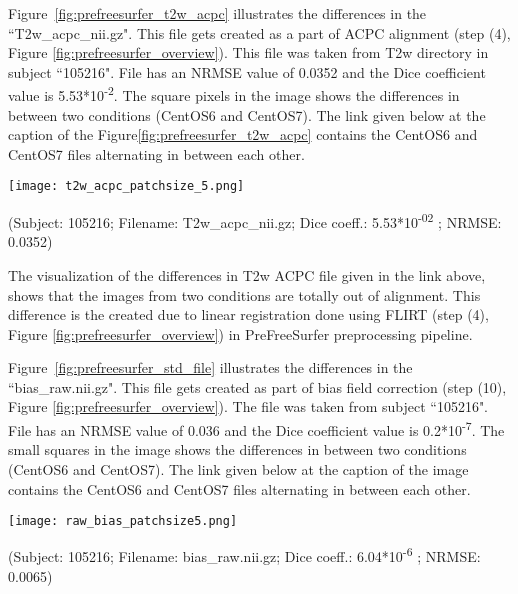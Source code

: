 Figure~\ref{fig:prefreesurfer_t2w_acpc} illustrates the differences in the ``T2w\_acpc\_nii.gz". This file gets created as a part of ACPC alignment (step (4), Figure \ref{fig:prefreesurfer_overview}). This file was taken from T2w directory in subject ``105216". File has an NRMSE value of 0.0352 and the Dice coefficient value is 5.53*10\textsuperscript{-2}. The square pixels in the image shows the differences in between two conditions (CentOS6 and CentOS7). The link given below at the caption of the Figure\ref{fig:prefreesurfer_t2w_acpc} contains the CentOS6 and CentOS7 files alternating in between each other.

\begin{center}
\texttt{[image: t2w\_acpc\_patchsize\_5.png]}
\caption*{(Subject: 105216; Filename: T2w\_acpc\_nii.gz; Dice coeff.: 5.53*10\textsuperscript{-02} ; NRMSE: 0.0352)}
\label{fig:prefreesurfer_t2w_acpc}
\end{center}

The visualization of the differences in T2w ACPC file given in the link above, shows that the images from two conditions are totally out of alignment. This difference is the created due to linear registration done using FLIRT (step (4), Figure \ref{fig:prefreesurfer_overview}) in PreFreeSurfer preprocessing pipeline.

Figure~\ref{fig:prefreesurfer_std_file} illustrates the differences in the ``bias\_raw.nii.gz".
This file gets created as part of bias field correction (step (10), Figure \ref{fig:prefreesurfer_overview}). The file was taken from subject ``105216". File has an NRMSE value of 0.036 and the Dice coefficient value is 0.2*10\textsuperscript{-7}. The small squares in the image shows the differences in between two conditions (CentOS6 and CentOS7).
The link given below at the caption of the image contains the CentOS6 and CentOS7 files alternating in between each other.

\begin{center}
\texttt{[image: raw\_bias\_patchsize5.png]}
\caption*{(Subject: 105216; Filename: bias\_raw.nii.gz; Dice coeff.: 6.04*10\textsuperscript{-6} ; NRMSE: 0.0065)}
\label{fig:prefreesurfer_std_file}
\end{center}

